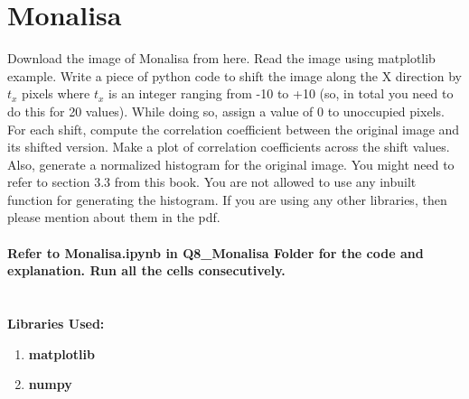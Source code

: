 \documentclass[12pt]{article}
\begin{document}
\section{Monalisa}
Download the image of Monalisa from here. Read the image using matplotlib example. Write a
piece of python code to shift the image along the X direction by $t_x$ pixels where $t_x$ is an integer
ranging from -10 to +10 (so, in total you need to do this for 20 values). While doing so, assign
a value of 0 to unoccupied pixels. For each shift, compute the correlation coefficient between the
original image and its shifted version. Make a plot of correlation coefficients across the shift values.
Also, generate a normalized histogram for the original image. You might need to refer to section
3.3 from this book. You are not allowed to use any inbuilt function for generating the histogram.
If you are using any other libraries, then please mention about them in the pdf.
\\
\\
\textbf{\Large{Refer to Monalisa.ipynb in Q8\_Monalisa Folder for the code and explanation. Run all the cells consecutively.}}
\\ \\ \\
\textbf{Libraries Used: } \\ 
\begin{enumerate}
    \item \textbf{\Large{matplotlib}}
    \item \textbf{\Large{numpy}}
\end{enumerate}
\end{document}
